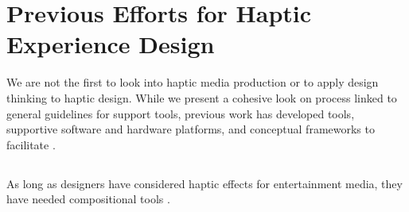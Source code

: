 %
%






%
%
\section{Previous Efforts for Haptic Experience Design}
We are not the first to look into haptic media production or to apply design thinking to haptic design.
While we present a cohesive look on \haxd process linked to general guidelines for \haxd support tools, previous work has developed  tools, supportive software and hardware platforms, and conceptual frameworks to facilitate \haxd.


\subsection{}
As long as designers have considered haptic effects for entertainment media, they have needed compositional tools %
\cite{Gunther2002}.


